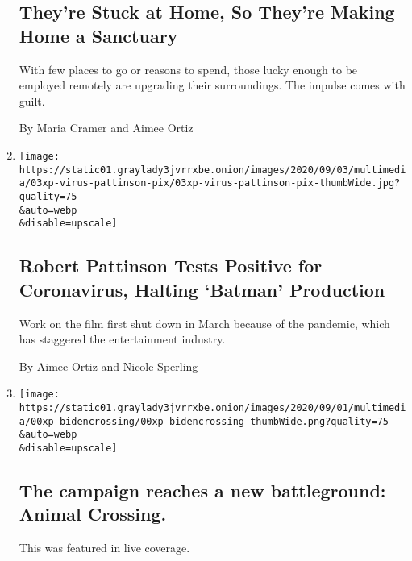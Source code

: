 \begin{enumerate}
  \hypertarget{theyre-stuck-at-home-so-theyre-making-home-a-sanctuary}{%
  \subsection{They're Stuck at Home, So They're Making Home a
  Sanctuary}\label{theyre-stuck-at-home-so-theyre-making-home-a-sanctuary}}

  With few places to go or reasons to spend, those lucky enough to be
  employed remotely are upgrading their surroundings. The impulse comes
  with guilt.

  By Maria Cramer and Aimee Ortiz
\item
  \href{/2020/09/03/arts/Robert-Pattinson-Covid-19-Batman.html}{}

  \texttt{[image: https://static01.graylady3jvrrxbe.onion/images/2020/09/03/multimedia/03xp-virus-pattinson-pix/03xp-virus-pattinson-pix-thumbWide.jpg?quality=75\\\&auto=webp\\\&disable=upscale]}

  \hypertarget{robert-pattinson-tests-positive-for-coronavirus-halting-batman-production}{%
  \subsection{Robert Pattinson Tests Positive for Coronavirus, Halting
  `Batman'
  Production}\label{robert-pattinson-tests-positive-for-coronavirus-halting-batman-production}}

  Work on the film first shut down in March because of the pandemic,
  which has staggered the entertainment industry.

  By Aimee Ortiz and Nicole Sperling
\item
  \href{/live/2020/09/01/us/trump-vs-biden/the-campaign-reaches-a-new-battleground-animal-crossing}{}

  \texttt{[image: https://static01.graylady3jvrrxbe.onion/images/2020/09/01/multimedia/00xp-bidencrossing/00xp-bidencrossing-thumbWide.png?quality=75\\\&auto=webp\\\&disable=upscale]}

  \hypertarget{the-campaign-reaches-a-new-battleground-animal-crossing}{%
  \subsection{The campaign reaches a new battleground: Animal
  Crossing.}\label{the-campaign-reaches-a-new-battleground-animal-crossing}}

  This was featured in live coverage.


\end{enumerate}
